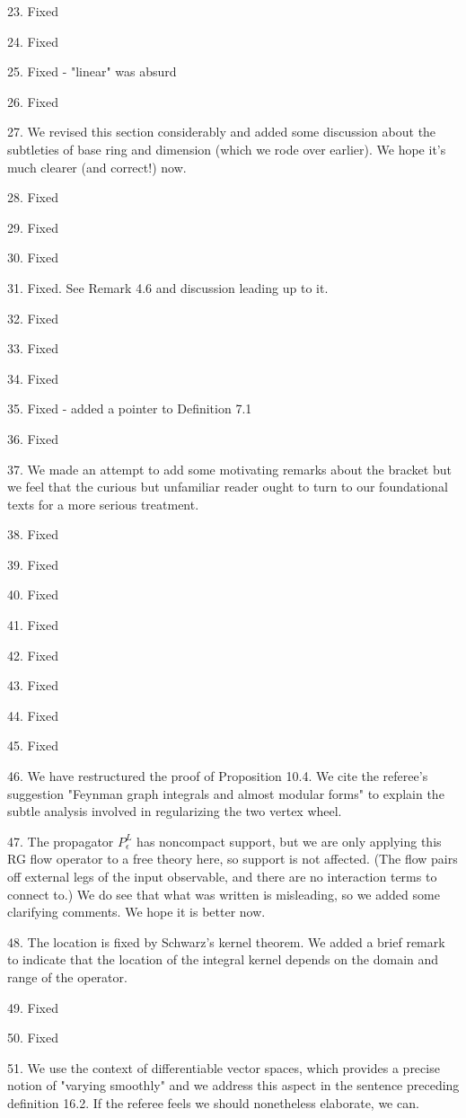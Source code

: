 \documentclass[10pt]{amsart}
\begin{document}
23. Fixed

24. Fixed

25. Fixed - "linear" was absurd

26. Fixed

27. We revised this section considerably and added some discussion about the subtleties of base ring and dimension (which we rode over earlier). We hope it's much clearer (and correct!) now.

28. Fixed

29. Fixed

30. Fixed

31. Fixed. See Remark 4.6 and discussion leading up to it.

32. Fixed

33. Fixed

34. Fixed

35. Fixed - added a pointer to Definition 7.1

36. Fixed

37. We made an attempt to add some motivating remarks about the bracket but we feel that the curious but unfamiliar reader ought to turn to our foundational texts for a more serious treatment.

38. Fixed

39. Fixed

40. Fixed

41. Fixed

42. Fixed

43. Fixed

44. Fixed

45. Fixed

46. We have restructured the proof of Proposition 10.4.
We cite the referee's suggestion "Feynman graph integrals and almost modular forms" to explain the subtle analysis involved in regularizing the two vertex wheel.

47. The propagator $P^L_\epsilon$ has noncompact support, but we are only applying this RG flow operator to a free theory here, so support is not affected. (The flow pairs off external legs of the input observable, and there are no interaction terms to connect to.) We do see that what was written is misleading, so we added some clarifying comments. We hope it is better now.

48. The location is fixed by Schwarz's kernel theorem. We added a brief remark to indicate that the location of the integral kernel depends on the domain and range of the operator.

49. Fixed

50. Fixed

51. We use the context of differentiable vector spaces, which provides a precise notion of "varying smoothly" and we address this aspect in the sentence preceding definition 16.2. If the referee feels we should nonetheless elaborate, we can.
\end{document}
